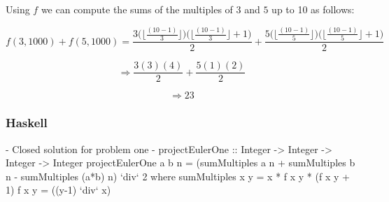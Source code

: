 \documentclass[11pt,a4paper]{report}
\begin{document}
                    Using $f$ we can compute the sums of the multiples of $3$ and $5$ up to 10 as follows:
                    
                    \[ f(3,1000) + f(5,1000) =
                        \frac{3 \Big(\Big\lfloor \frac{(10 - 1)}{3} \Big\rfloor \Big) 
                        \Big(\Big\lfloor \frac{(10 - 1)}{3} \Big\rfloor + 1 \Big)}{2}                        
                        +                        
                        \frac{5 \Big(\Big\lfloor \frac{(10 - 1)}{5} \Big\rfloor \Big) 
                        \Big(\Big\lfloor \frac{(10 - 1)}{5} \Big\rfloor + 1 \Big)}{2}  \]
		            
		            \[ \Rightarrow \frac{3(3)(4)}{2} + \frac{5(1)(2)}{2}\]

                    \[ \Rightarrow 23 \]

    		        \subsubsection{Haskell}
    		        
	                	\begin{haskellCode}
	{-
	    Closed solution for problem one
	-}
	projectEulerOne :: Integer -> Integer -> Integer -> Integer
	projectEulerOne a b n = (sumMultiples a n  + sumMultiples b n  
	                            - sumMultiples (a*b) n) `div` 2
	        where sumMultiples x y = x * f x y * (f x y + 1)
	              f x y = ((y-1) `div` x)
                        \end{haskellCode}		            
	
\end{document}
